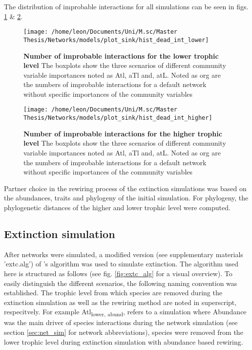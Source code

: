 \documentclass[12pt,a4paper]{article}
\begin{document}
The distribution of improbable interactions for all simulations can be seen in figs. \ref{dead_int_low} \& \ref{dead_int_high}. 

\begin{figure}[H]
	 \texttt{[image: /home/leon/Documents/Uni/M.sc/Master Thesis/Networks/models/plot\_sink/hist\_dead\_int\_lower]}
	 \caption{\textbf{Number of improbable interactions for the lower trophic level} The boxplots show the three scenarios of different community variable importances noted as Atl, aTl and, atL. Noted as org are the numbers of improbable interactions for a default network without specific importances of the community variables}
	 \label{dead_int_low}
\end{figure}

\begin{figure}[H]
	 \texttt{[image: /home/leon/Documents/Uni/M.sc/Master Thesis/Networks/models/plot\_sink/hist\_dead\_int\_higher]}
	 \caption{\textbf{Number of improbable interactions for the higher trophic level} The boxplots show the three scenarios of different community variable importances noted as Atl, aTl and, atL. Noted as org are the numbers of improbable interactions for a default network without specific importances of the community variables}
	 \label{dead_int_high}
\end{figure}



	Partner choice in the rewiring process of the extinction simulations was based on the abundances, traits and phylogeny of the initial simulation. For phylogeny, the phylogenetic distances of the higher and lower trophic level were computed.
	\subsection{Extinction simulation} \label{sec:extc_sim}
	After networks were simulated, a modified version (see supplementary materials 'extc.alg') of \citeauthor{Vizentin-Bugoni2019}'s algorithm was used to simulate extinction. The algorithm used here is structured as follows (see fig. \ref{fig:extc_alg} for a visual overview). To easily distinguish the different scenarios, the following naming convention was established. The trophic level from which species are removed during the extinction simulation as well as the rewiring method are noted in superscript, respecitvely. For example Atl\textsubscript{lower, abund}, refers to a simulation where Abundance was the main driver of species interactions during the network simulation (see section \ref{sec:net_sim} for network abbreviations), species were removed from the lower trophic level during extinction simulation with abundance based rewiring.
\end{document}
